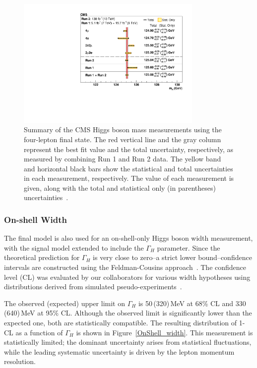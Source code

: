 \begin{figure}[!htb]
  \centering
  \includegraphics[width=0.8\textwidth]{Figure_009.pdf}
  \caption{Summary of the CMS Higgs boson mass measurements using the four-lepton final state. The red vertical line and the gray column represent the best fit value and the total uncertainty, respectively, as measured by combining Run 1 and Run 2 data. The yellow band and horizontal black bars show the statistical and total uncertainties in each measurement, respectively. The value of each measurement is given, along with the total and statistical only (in parentheses) uncertainties~\cite{PhysRevD.111.092014}.}
  \label{Run1Run2_scan}
\end{figure}

\subsubsection{On-shell Width}

The final \onshell model is also used for an on-shell-only Higgs boson width measurement, with the signal model extended to include the $\Gamma_H$ parameter. Since the theoretical prediction for $\Gamma_H$ is very close to zero--a strict lower bound--confidence intervals are constructed using the Feldman-Cousins approach~\cite{FC}. The confidence level (CL) was evaluated by our collaborators for various width hypotheses using distributions derived from simulated pseudo-experiments~\cite{PhysRevD.111.092014}.

The observed (expected) upper limit on $\Gamma_H$ is 50\,(320)\,MeV at 68\% CL and 330\,(640)\,MeV at 95\% CL. Although the observed limit is significantly lower than the expected one, both are statistically compatible. The resulting distribution of 1-CL as a function of $\Gamma_H$ is shown in Figure~\ref{OnShell_width}. This measurement is statistically limited; the dominant uncertainty arises from statistical fluctuations, while the leading systematic uncertainty is driven by the lepton momentum resolution.

